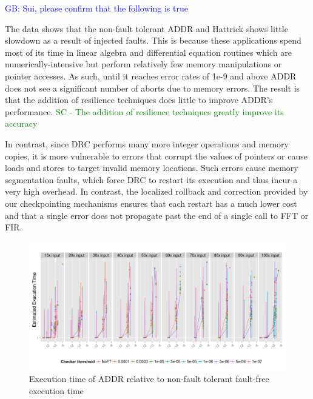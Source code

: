 \documentclass{sig-alternate}
\newcommand{\sui}[1]{%
  \textcolor{green}{SC - #1}
}
\newcommand{\greg}[1]{%
  \textcolor{blue}{GB: #1}
}
\begin{document}
\greg{Sui, please confirm that the following is true}
The data shows that the non-fault tolerant ADDR and Hattrick shows little slowdown as a result of injected faults.
This is because these applications spend most of its time in linear algebra and differential equation routines which are numerically-intensive but perform relatively few memory manipulations or pointer accesses.
As such, until it reaches error rates of 1e-9 and above ADDR does not see a significant number of aborts due to memory errors.
The result is that the addition of resilience techniques does little to improve ADDR's performance. \sui{The addition of resilience techniques greatly improve its accuracy}

In contrast, since DRC performs many more integer operations and memory copies, it is more vulnerable to errors that corrupt the values of pointers or cause loads and stores to target invalid memory locations.
Such errors cause memory segmentation faults, which force DRC to restart its execution and thus incur a very high overhead.
In contrast, the localized rollback and correction provided by our checkpointing mechanisms ensures that each restart has a much lower cost and that a single error does not propagate past the end of a single call to FFT or FIR.

\begin{figure}[ht!]
\centering
\includegraphics[width=2.00\columnwidth]{figs/Lasso_EstdCost.png}
\vspace{-10pt}
\caption{Execution time of ADDR relative to non-fault tolerant fault-free execution time}
\vspace{-10pt}
\label{fig:Lasso_EstdCost}
\end{figure}
\end{document}
